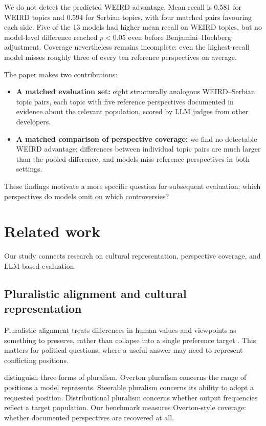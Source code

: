 \documentclass[11pt,a4paper]{article}
\begin{document}
We do not detect the predicted WEIRD advantage. Mean recall is 0.581 for WEIRD topics and 0.594 for Serbian topics, with four matched pairs favouring each side. Five of the 13 models had higher mean recall on WEIRD topics, but no model-level difference reached $p<0.05$ even before Benjamini--Hochberg adjustment. Coverage nevertheless remains incomplete: even the highest-recall model misses roughly three of every ten reference perspectives on average.

The paper makes two contributions:
\begin{itemize}
\item \textbf{A matched evaluation set:} eight structurally analogous WEIRD--Serbian topic pairs, each topic with five reference perspectives documented in evidence about the relevant population, scored by LLM judges from other developers.
\item \textbf{A matched comparison of perspective coverage:} we find no detectable WEIRD advantage; differences between individual topic pairs are much larger than the pooled difference, and models miss reference perspectives in both settings.
\end{itemize}

These findings motivate a more specific question for subsequent evaluation: which perspectives do models omit on which controversies?

\section{Related work}
\label{sec:Related work}
Our study connects research on cultural representation, perspective coverage, and LLM-based evaluation.

\subsection{Pluralistic alignment and cultural representation}
\label{sec:Pluralistic alignment and cultural representation}
Pluralistic alignment treats differences in human values and viewpoints as something to preserve, rather than collapse into a single preference target \cite{sorensenRoadmapPluralisticAlignment2024, fengModularPluralismPluralistic2024, aliOperationalizingPluralisticValues2025}. This matters for political questions, where a useful answer may need to represent conflicting positions.

\citet{sorensenRoadmapPluralisticAlignment2024} distinguish three forms of pluralism. Overton pluralism concerns the range of positions a model represents. Steerable pluralism concerns its ability to adopt a requested position. Distributional pluralism concerns whether output frequencies reflect a target population. Our benchmark measures Overton-style coverage: whether documented perspectives are recovered at all.
\end{document}
